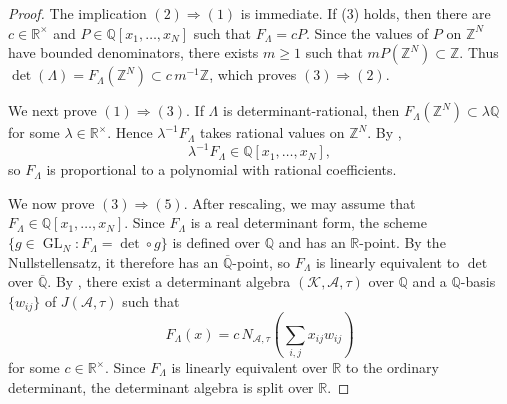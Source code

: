 \documentclass[reqno,11pt]{amsart}
\numberwithin{equation}{section}
\theoremstyle{definition}
\theoremstyle{remark}
\newcommand{\op}{\operatorname}
\newcommand{\GL}{\op{GL}}
\begin{document}
\begin{proof}
The implication $(2)\Rightarrow(1)$ is immediate. If (3) holds, then
there are $c\in\mathbb R^\times$ and
$P\in\mathbb Q[x_1,\dots,x_N]$ such that $F_\Lambda=cP$. Since the
values of $P$ on $\mathbb Z^N$ have bounded denominators, there exists
$m\ge1$ such that $ mP(\mathbb Z^N)\subset\mathbb Z$.
Thus $\det(\Lambda)=F_\Lambda(\mathbb Z^N)\subset c\,m^{-1}\mathbb Z$, which proves $(3)\Rightarrow(2)$.

We next prove $(1)\Rightarrow(3)$. If $\Lambda$ is
determinant-rational, then $F_\Lambda(\mathbb Z^N)\subset\lambda\mathbb Q$ for some $\lambda\in\mathbb R^\times$. Hence
$\lambda^{-1}F_\Lambda$ takes rational values on $\mathbb Z^N$.
By ,
$$
    \lambda^{-1}F_\Lambda\in\mathbb Q[x_1,\dots,x_N],
$$
so $F_\Lambda$ is proportional to a polynomial with rational
coefficients.

We now prove $(3)\Rightarrow(5)$. After rescaling, we may assume that
$F_\Lambda\in\mathbb Q[x_1,\dots,x_N]$. Since $F_\Lambda$ is a real
determinant form, the scheme
$\{g\in\GL_N:F_\Lambda=\det\circ g\}$ is defined over $\mathbb Q$ and
has an $\mathbb R$-point. By the Nullstellensatz, it therefore has an
$\overline{\mathbb Q}$-point,
so $F_\Lambda$ is linearly equivalent to $\det$ over
$\overline{\mathbb Q}$. By
, there exist a determinant algebra
$(\mathscr{K},\mathscr{A},\tau)$ over $\mathbb Q$ and a $\mathbb Q$-basis
$\{w_{ij}\}$ of $J(\mathscr{A},\tau)$ such that
$$
    F_\Lambda(x)
    =
    c\,
    N_{\mathscr{A},\tau}\!\left(\sum_{i,j}x_{ij}w_{ij}\right)
$$
for some $c\in\mathbb R^\times$. Since $F_\Lambda$ is linearly
equivalent over $\mathbb R$ to the ordinary determinant, the determinant
algebra is split over $\mathbb R$.


\end{proof}
\end{document}
